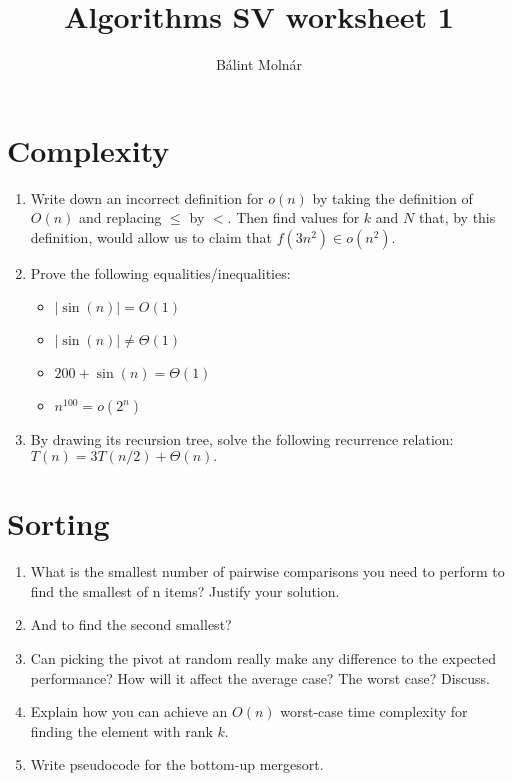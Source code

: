 \documentclass{article}
\title{{Algorithms SV worksheet 1}}
\author{Bálint Molnár}
\begin{document}
\maketitle


\section{Complexity}

\begin{enumerate}
    \item Write down an incorrect definition for $o(n)$ by taking the definition of $O(n)$ and
replacing $\leq$ by $<$. Then find values for $k$ and $N$ that, by this definition, would
allow us to claim that $f (3n^2) \in o(n^2)$.

\item 
Prove the following equalities/inequalities:
\begin{itemize}
    \item $| \sin(n)| = O(1)$
    \item $| \sin(n)| \neq  \Theta(1)$
    \item $ 200 + \sin(n) =  \Theta(1)$
    \item $n^{100} = o(2^n)$
\end{itemize}
\item 
By drawing its recursion tree, solve the following recurrence relation: $T(n)=3T(n/2)+\Theta(n).$

\end{enumerate}

\section{Sorting}

\begin{enumerate}
    \item What is the smallest number of pairwise comparisons you need to perform to
find the smallest of n items? Justify your solution.
\item And to find the second smallest?
\item Can picking the pivot at random really make any difference to the
expected performance? How will it affect the average case? The
worst case? Discuss.

\item Explain how you can achieve an $O(n)$ worst-case time complexity for finding the element with rank $k$.
\item Write pseudocode for the bottom-up mergesort.
\end{enumerate}
\end{document}
